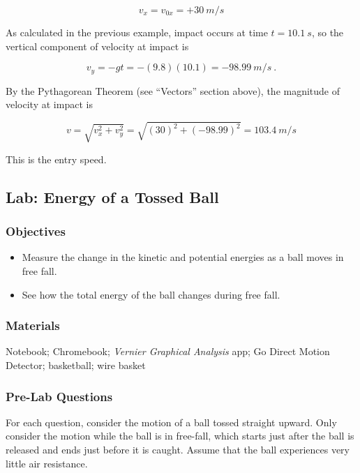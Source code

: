 \documentclass[main-physics.tex]{subfiles}
\begin{document}
\begin{equation*}
    v_x = v_{0x} = +\SI{30}{m/s}
\end{equation*}

As calculated in the previous example, impact occurs at time $t=\SI{10.1}{s}$, so the vertical component of velocity at impact is

\begin{equation*}
    v_y = - g t =  - (9.8)(10.1) = \SI{-98.99}{m/s}\ .
\end{equation*}

By the Pythagorean Theorem (see ``Vectors'' section above), the magnitude of velocity at impact is

\begin{equation*}
    v = \sqrt{v_x^2 + v_y^2}
    = \sqrt{\left(30\right)^2 + \left(-98.99\right)^2}
    = \SI{103.4}{m/s}
\end{equation*}

This is the entry speed.


\subsection{Lab: Energy of a Tossed Ball}

\subsubsection*{Objectives}

\begin{itemize}
\setlength\itemsep{-1ex}
    \item Measure the change in the kinetic and potential energies as a ball moves in free fall.
    \item See how the total energy of the ball changes during free fall.
\end{itemize}

\subsubsection*{Materials}

Notebook; Chromebook; \textit{Vernier Graphical Analysis} app; Go Direct Motion Detector; basketball; wire basket

\subsubsection*{Pre-Lab Questions}
For each question, consider the motion of a ball tossed straight upward. Only consider the motion while the ball is in free-fall, which starts just after the ball is released and ends just before it is caught. Assume that the ball experiences very little air resistance.
\end{document}

